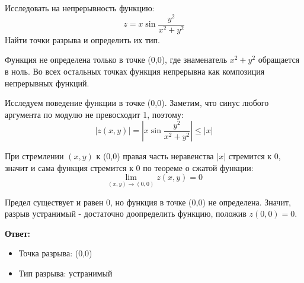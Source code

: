 \begin{problem}
Исследовать на непрерывность функцию:
\[ z = x \sin \frac{y^2}{x^2+y^2} \]
Найти точки разрыва и определить их тип.
\end{problem}

\begin{solution}
Функция не определена только в точке (0,0), где знаменатель $x^2 + y^2$ обращается в ноль. Во всех остальных точках функция непрерывна как композиция непрерывных функций.

Исследуем поведение функции в точке (0,0). Заметим, что синус любого аргумента по модулю не превосходит 1, поэтому:
\[ |z(x,y)| = \left| x \sin \frac{y^2}{x^2+y^2} \right| \leq |x| \]

При стремлении $(x,y)$ к (0,0) правая часть неравенства $|x|$ стремится к 0, значит и сама функция стремится к 0 по теореме о сжатой функции:
\[ \lim_{(x,y) \to (0,0)} z(x,y) = 0 \]

Предел существует и равен 0, но функция в точке (0,0) не определена. Значит, разрыв устранимый - достаточно доопределить функцию, положив $z(0,0) = 0$.

\textbf{Ответ:} 
\begin{itemize}
    \item Точка разрыва: (0,0)
    \item Тип разрыва: устранимый
\end{itemize}
\end{solution}